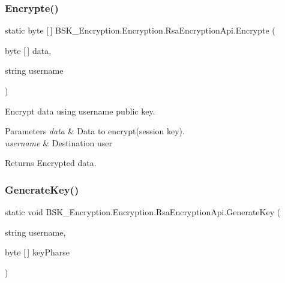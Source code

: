 \subsubsection{\texorpdfstring{Encrypte()}{Encrypte()}}
{\footnotesize\ttfamily static byte \mbox{[}$\,$\mbox{]} B\+S\+K\+\_\+\+Encryption.\+Encryption.\+Rsa\+Encryption\+Api.\+Encrypte (\begin{DoxyParamCaption}\item[{byte \mbox{[}$\,$\mbox{]}}]{data,  }\item[{string}]{username }\end{DoxyParamCaption})\hspace{0.3cm}{\ttfamily [static]}}



Encrypt data using username public key. 


\begin{DoxyParams}{Parameters}
{\em data} & Data to encrypt(session key).\\
\hline
{\em username} & Destination user\\
\hline
\end{DoxyParams}
\begin{DoxyReturn}{Returns}
Encrypted data.
\end{DoxyReturn}
\mbox{\label{class_b_s_k___encryption_1_1_encryption_1_1_rsa_encryption_api_a9487324e4e7f5f3e112f4fcd56551102}} 
\subsubsection{\texorpdfstring{Generate\+Key()}{GenerateKey()}}
{\footnotesize\ttfamily static void B\+S\+K\+\_\+\+Encryption.\+Encryption.\+Rsa\+Encryption\+Api.\+Generate\+Key (\begin{DoxyParamCaption}\item[{string}]{username,  }\item[{byte \mbox{[}$\,$\mbox{]}}]{key\+Pharse }\end{DoxyParamCaption})\hspace{0.3cm}{\ttfamily [static]}}



